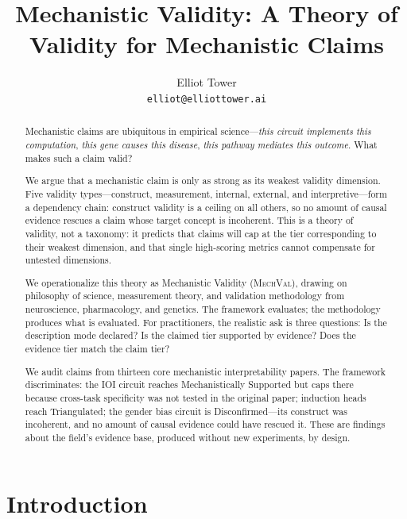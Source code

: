 \documentclass{article}
\title{Mechanistic Validity: A Theory of Validity for Mechanistic Claims}
\author{
Elliot Tower \\
\texttt{elliot@elliottower.ai}
}
\newcommand{\mechval}{\textsc{MechVal}}
\begin{document}
\maketitle

\begin{abstract}
Mechanistic claims are ubiquitous in empirical science---\emph{this circuit implements this computation}, \emph{this gene causes this disease}, \emph{this pathway mediates this outcome}. What makes such a claim valid?

We argue that a mechanistic claim is only as strong as its weakest validity dimension. Five validity types---construct, measurement, internal, external, and interpretive---form a dependency chain: construct validity is a ceiling on all others, so no amount of causal evidence rescues a claim whose target concept is incoherent. This is a theory of validity, not a taxonomy: it predicts that claims will cap at the tier corresponding to their weakest dimension, and that single high-scoring metrics cannot compensate for untested dimensions.

We operationalize this theory as Mechanistic Validity (\mechval{}), drawing on philosophy of science, measurement theory, and validation methodology from neuroscience, pharmacology, and genetics. The framework evaluates; the methodology produces what is evaluated. For practitioners, the realistic ask is three questions: Is the description mode declared? Is the claimed tier supported by evidence? Does the evidence tier match the claim tier?

We audit claims from thirteen core mechanistic interpretability papers. The framework discriminates: the IOI circuit reaches Mechanistically Supported but caps there because cross-task specificity was not tested in the original paper; induction heads reach Triangulated; the gender bias circuit is Disconfirmed---its construct was incoherent, and no amount of causal evidence could have rescued it. These are findings about the field's evidence base, produced without new experiments, by design.
\end{abstract}

\section{Introduction}
\label{sec:intro}
\end{document}
